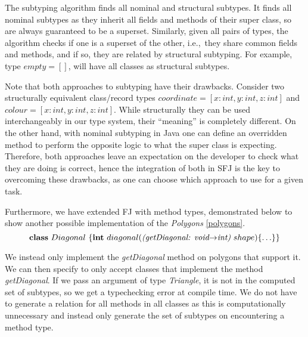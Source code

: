 \documentclass[runningheads]{llncs}
\begin{document}
The subtyping algorithm finds all nominal and structural subtypes.
It finds all nominal subtypes as they inherit all fields and methods of their super class, so are always guaranteed to be a superset.
Similarly, given all pairs of types, the algorithm checks if one is a superset of the other, i.e.,\ they share common fields and methods, and if so, they are related by structural subtyping.
For example, type $empty = []$, will have all classes as structural subtypes.

Note that both approaches to subtyping have their drawbacks.
Consider two structurally equivalent class/record types $coordinate = [x:int, y:int, z:int]$ and $colour = [x:int, y:int, z:int]$.
While structurally they can be used interchangeably in our type system, their ``meaning'' is completely different.
On the other hand, with nominal subtyping in Java one can define an overridden method to perform the opposite logic to what the super class is expecting.
Therefore, both approaches leave an expectation on the developer to check what they are doing is correct, hence the integration of both in SFJ is the key to overcoming these drawbacks, as one can choose which approach to use for a given task.

Furthermore, we have extended FJ with method types, demonstrated below to show another possible implementation of the \emph{Polygons} \autoref{polygons}.
$$
    \mathbf{class} \  Diagonal \ \{
    \mathbf{int}\ diagonal(\textit{(getDiagonal: void$\rightarrow$int)}  \ shape)\{\ldots\}
    \}
$$

We instead only implement the \emph{getDiagonal} method on polygons that support it. We can then specify to only accept classes that implement the method \emph{getDiagonal}. If we pass an argument of type \emph{Triangle}, it is not in the computed set of subtypes, so we get a typechecking error at compile time.
We do not have to generate a relation for all methods in all classes as this is computationally unnecessary and instead
only generate the set of subtypes on encountering a method type.

\end{document}
